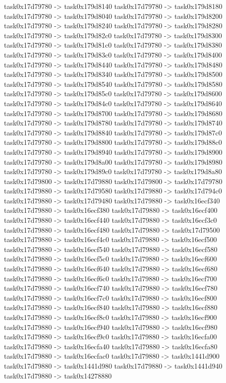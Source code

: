 {	task0x17d79780 -> task0x179d8140
	task0x17d79780 -> task0x179d8180
	task0x17d79780 -> task0x179d8040
	task0x17d79780 -> task0x179d8200
	task0x17d79780 -> task0x179d8240
	task0x17d79780 -> task0x179d8280
	task0x17d79780 -> task0x179d82c0
	task0x17d79780 -> task0x179d8300
	task0x17d79780 -> task0x179d81c0
	task0x17d79780 -> task0x179d8380
	task0x17d79780 -> task0x179d83c0
	task0x17d79780 -> task0x179d8400
	task0x17d79780 -> task0x179d8440
	task0x17d79780 -> task0x179d8480
	task0x17d79780 -> task0x179d8340
	task0x17d79780 -> task0x179d8500
	task0x17d79780 -> task0x179d8540
	task0x17d79780 -> task0x179d8580
	task0x17d79780 -> task0x179d85c0
	task0x17d79780 -> task0x179d8600
	task0x17d79780 -> task0x179d84c0
	task0x17d79780 -> task0x179d8640
	task0x17d79780 -> task0x179d8700
	task0x17d79780 -> task0x179d8680
	task0x17d79780 -> task0x179d8780
	task0x17d79780 -> task0x179d8740
	task0x17d79780 -> task0x179d8840
	task0x17d79780 -> task0x179d87c0
	task0x17d79780 -> task0x179d8800
	task0x17d79780 -> task0x179d88c0
	task0x17d79780 -> task0x179d8940
	task0x17d79780 -> task0x179d8900
	task0x17d79780 -> task0x179d8a00
	task0x17d79780 -> task0x179d8980
	task0x17d79780 -> task0x179d89c0
	task0x17d79780 -> task0x179d8a80
	task0x17d79800 -> task0x17d79880
	task0x17d79800 -> task0x17d79780
	task0x17d79880 -> task0x17d79580
	task0x17d79880 -> task0x17d794c0
	task0x17d79880 -> task0x17d79480
	task0x17d79880 -> task0x16ecf340
	task0x17d79880 -> task0x16ecf380
	task0x17d79880 -> task0x16ecf400
	task0x17d79880 -> task0x16ecf440
	task0x17d79880 -> task0x16ecf3c0
	task0x17d79880 -> task0x16ecf480
	task0x17d79880 -> task0x17d79500
	task0x17d79880 -> task0x16ecf4c0
	task0x17d79880 -> task0x16ecf500
	task0x17d79880 -> task0x16ecf540
	task0x17d79880 -> task0x16ecf580
	task0x17d79880 -> task0x16ecf5c0
	task0x17d79880 -> task0x16ecf600
	task0x17d79880 -> task0x16ecf640
	task0x17d79880 -> task0x16ecf680
	task0x17d79880 -> task0x16ecf6c0
	task0x17d79880 -> task0x16ecf700
	task0x17d79880 -> task0x16ecf740
	task0x17d79880 -> task0x16ecf780
	task0x17d79880 -> task0x16ecf7c0
	task0x17d79880 -> task0x16ecf800
	task0x17d79880 -> task0x16ecf840
	task0x17d79880 -> task0x16ecf880
	task0x17d79880 -> task0x16ecf8c0
	task0x17d79880 -> task0x16ecf900
	task0x17d79880 -> task0x16ecf940
	task0x17d79880 -> task0x16ecf980
	task0x17d79880 -> task0x16ecf9c0
	task0x17d79880 -> task0x16ecfa00
	task0x17d79880 -> task0x16ecfa40
	task0x17d79880 -> task0x16ecfa80
	task0x17d79880 -> task0x16ecfac0
	task0x17d79880 -> task0x1441d900
	task0x17d79880 -> task0x1441d980
	task0x17d79880 -> task0x1441d940
	task0x17d79880 -> task0x14278880
}
